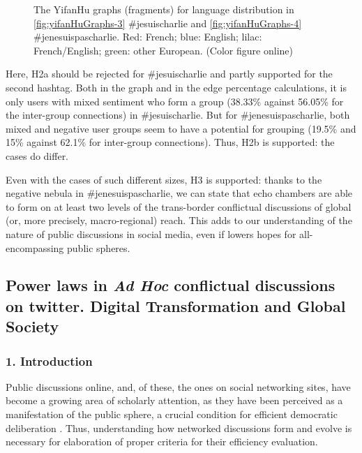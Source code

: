 \begin{figure}[ht]
	\caption{The YifanHu graphs (fragments) for language distribution in \cref{fig:yifanHuGraphs-3} \#jesuischarlie and \cref{fig:yifanHuGraphs-4} \#jenesuispascharlie. Red: French; blue: English; lilac: French/English; green: other European. (Color figure online)}\label{fig:yifanHuGraphs-34}
\end{figure}

Here, H2a should be rejected for \#jesuischarlie and partly supported for the second hashtag. Both in the graph and in the edge percentage calculations, it is only users with mixed sentiment who form a group (38.33\% against 56.05\% for the inter-group connections) in \#jesuischarlie. But for \#jenesuispascharlie, both mixed and negative user groups seem to have a potential for grouping (19.5\% and 15\% against 62.1\% for inter-group connections). Thus, H2b is supported: the cases do differ.

Even with the cases of such different sizes, H3 is supported: thanks to the negative nebula in \#jenesuispascharlie, we can state that echo chambers are able to form on at least two levels of the trans-border conflictual discussions of global (or, more precisely, macro-regional) reach. This adds to our understanding of the nature of public discussions in social media, even if lowers hopes for all-encompassing public spheres.

\subsection{Power laws in \textit{Ad Hoc} conflictual discussions on twitter. Digital Transformation and Global Society}\label{subsec:ch5/sec1/sub5}

\subsubsection{1. Introduction}

Public discussions online, and, of these, the ones on social networking sites, have become a growing area of scholarly attention, as they have been perceived as a manifestation of the public sphere, a crucial condition for efficient democratic deliberation \cite{Habermas}. Thus, understanding how networked discussions form and evolve is necessary for elaboration of proper criteria for their efficiency evaluation.

